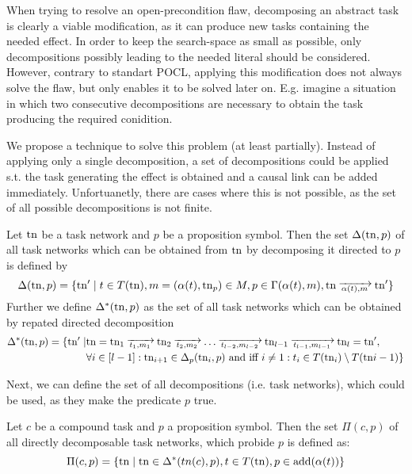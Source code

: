 \documentclass{scrartcl}
\begin{document}
When trying to resolve an open-precondition flaw, decomposing an abstract task is clearly a viable modification, as it can produce new tasks containing the needed effect.
In order to keep the search-space as small as possible, only decompositions possibly leading to the needed literal should be considered.
However, contrary to standart POCL, applying this modification does not always solve the flaw, but only enables it to be solved later on.
E.g. imagine a situation in which two consecutive decompositions are necessary to obtain the task producing the required conidition.

We propose a technique to solve this problem (at least partially).
Instead of applying only a single decomposition, a set of decompositions could be applied s.t. the task generating the effect is obtained and a causal link can be added immediately.
Unfortuanetly, there are cases where this is not possible, as the set of all possible decompositions is not finite.

\begin{definition}
Let $\mathrm{tn}$ be a task network and $p$ be a proposition symbol.
Then the set $\Delta(\mathrm{tn},p)$ of all task networks which can be obtained from $\mathrm{tn}$ by decomposing it directed to $p$ is defined by
\[\Delta(\tn,p) = \{\tn' \mid t \in T(\tn), m=(\alpha(t),\tn_p) \in M, p \in \Gamma(\alpha(t),m), \tn \decompose{\alpha(t)}{m} \tn' \}\]
Further we define $\Delta^*(\mathrm{tn},p)$ as the set of all task networks which can be obtained by repated directed decomposition
\begin{align*}
\Delta^*(\tn,p) = \{\tn' \mid &\tn = \tn_1 \decompose{t_1}{m_1} \tn_2 \decompose{t_2}{m_2} \dots \decompose{t_{l-2}}{m_{l-2}} \tn_{l-1} \decompose{t_{l-1}}{m_{l-1}} \tn_l = \tn', \\
& \forall i \in [l-1]: \tn_{i+1} \in \Delta_p(\tn_i,p) \text{ and iff } i\neq 1: t_i \in T(\tn_i) \setminus T(\tn{i-1})\}
\end{align*}
\end{definition}

Next, we can define the set of all decompositions (i.e. task networks), which could be used, as they make the predicate $p$ true.
\begin{definition}
Let $c$ be a compound task and $p$ a proposition symbol.
Then the set $\Pi(c,p)$ of all directly decomposable task networks, which probide $p$ is defined as:
\[\Pi(c,p) = \{\mathrm{tn} \mid \mathrm{tn} \in \Delta^*(tn(c),p), t \in T(\mathrm{tn}), p \in \text{add}(\alpha(t))\}\]
\end{definition}
\end{document}
